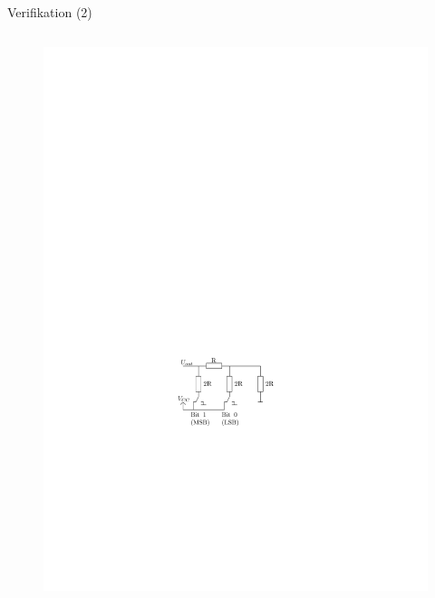 \documentclass{beamer}
\begin{document}
\begin{frame}{Verifikation (2)}
\begin{columns}
\begin{column}{0.4\textwidth}
\begin{figure}[htbp]
  \centering
  \includegraphics[scale=0.6]{./images/arduinoio-r2r-network.pdf}
  \end{figure}
 \end{column}
\end{columns}
\end{frame}
\end{document}
